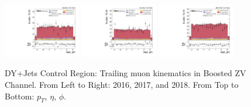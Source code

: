 \begin{figure}[!ht]
  \includegraphics[width=0.30\textwidth]{analysis_plots/2016_zv/cr_vjets_m/lep2_phi.pdf}
  \includegraphics[width=0.30\textwidth]{analysis_plots/2017_zv/cr_vjets_m/lep2_phi.pdf}
  \includegraphics[width=0.30\textwidth]{analysis_plots/2018_zv/cr_vjets_m/lep2_phi.pdf} \\
  \caption[DY+Jets Control Region: Trailing muon kinematics in Boosted ZV Channel]%
  {DY+Jets Control Region: Trailing muon kinematics in Boosted ZV Channel. From Left to Right: 2016,
    2017, and 2018. From Top to Bottom: \( p_T \), \( \eta \), \( \phi \).}%
  \label{fig:zv-cr-vjets-m-lep2-pt-eta-phi}
\end{figure}

